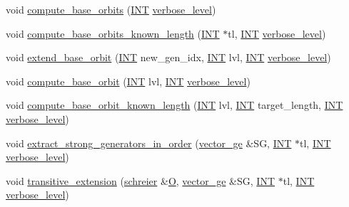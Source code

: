 \begin{DoxyCompactItemize}
\item 
void \mbox{\hyperlink{classsims_ad39d4ca10a1cf40a440f92d948802388}{compute\+\_\+base\+\_\+orbits}} (\mbox{\hyperlink{galois_8h_a09fddde158a3a20bd2dcadb609de11dc}{I\+NT}} \mbox{\hyperlink{simeon_8_c_a818073fbcc2f439e7c56952f67386122}{verbose\+\_\+level}})
\item 
void \mbox{\hyperlink{classsims_a7f6b55695e29ce46f965ac4c87c31a06}{compute\+\_\+base\+\_\+orbits\+\_\+known\+\_\+length}} (\mbox{\hyperlink{galois_8h_a09fddde158a3a20bd2dcadb609de11dc}{I\+NT}} $\ast$tl, \mbox{\hyperlink{galois_8h_a09fddde158a3a20bd2dcadb609de11dc}{I\+NT}} \mbox{\hyperlink{simeon_8_c_a818073fbcc2f439e7c56952f67386122}{verbose\+\_\+level}})
\item 
void \mbox{\hyperlink{classsims_a1ded039dbe83239f4e116fe5b84fdcea}{extend\+\_\+base\+\_\+orbit}} (\mbox{\hyperlink{galois_8h_a09fddde158a3a20bd2dcadb609de11dc}{I\+NT}} new\+\_\+gen\+\_\+idx, \mbox{\hyperlink{galois_8h_a09fddde158a3a20bd2dcadb609de11dc}{I\+NT}} lvl, \mbox{\hyperlink{galois_8h_a09fddde158a3a20bd2dcadb609de11dc}{I\+NT}} \mbox{\hyperlink{simeon_8_c_a818073fbcc2f439e7c56952f67386122}{verbose\+\_\+level}})
\item 
void \mbox{\hyperlink{classsims_aabf4d450355421818e97e614bbfe2e91}{compute\+\_\+base\+\_\+orbit}} (\mbox{\hyperlink{galois_8h_a09fddde158a3a20bd2dcadb609de11dc}{I\+NT}} lvl, \mbox{\hyperlink{galois_8h_a09fddde158a3a20bd2dcadb609de11dc}{I\+NT}} \mbox{\hyperlink{simeon_8_c_a818073fbcc2f439e7c56952f67386122}{verbose\+\_\+level}})
\item 
void \mbox{\hyperlink{classsims_af93aba6d77ea121ff5e1dec9fefa0002}{compute\+\_\+base\+\_\+orbit\+\_\+known\+\_\+length}} (\mbox{\hyperlink{galois_8h_a09fddde158a3a20bd2dcadb609de11dc}{I\+NT}} lvl, \mbox{\hyperlink{galois_8h_a09fddde158a3a20bd2dcadb609de11dc}{I\+NT}} target\+\_\+length, \mbox{\hyperlink{galois_8h_a09fddde158a3a20bd2dcadb609de11dc}{I\+NT}} \mbox{\hyperlink{simeon_8_c_a818073fbcc2f439e7c56952f67386122}{verbose\+\_\+level}})
\item 
void \mbox{\hyperlink{classsims_aeaf4ae6bb916342a66470730af69923a}{extract\+\_\+strong\+\_\+generators\+\_\+in\+\_\+order}} (\mbox{\hyperlink{classvector__ge}{vector\+\_\+ge}} \&SG, \mbox{\hyperlink{galois_8h_a09fddde158a3a20bd2dcadb609de11dc}{I\+NT}} $\ast$tl, \mbox{\hyperlink{galois_8h_a09fddde158a3a20bd2dcadb609de11dc}{I\+NT}} \mbox{\hyperlink{simeon_8_c_a818073fbcc2f439e7c56952f67386122}{verbose\+\_\+level}})
\item 
void \mbox{\hyperlink{classsims_a325b6193239b8d4c8798a47ec1b834ac}{transitive\+\_\+extension}} (\mbox{\hyperlink{classschreier}{schreier}} \&\mbox{\hyperlink{pentomino__5x5_8_c_a0824fca46b94fc0ff4ae72f3c56481aa}{O}}, \mbox{\hyperlink{classvector__ge}{vector\+\_\+ge}} \&SG, \mbox{\hyperlink{galois_8h_a09fddde158a3a20bd2dcadb609de11dc}{I\+NT}} $\ast$tl, \mbox{\hyperlink{galois_8h_a09fddde158a3a20bd2dcadb609de11dc}{I\+NT}} \mbox{\hyperlink{simeon_8_c_a818073fbcc2f439e7c56952f67386122}{verbose\+\_\+level}})

\end{DoxyCompactItemize}
